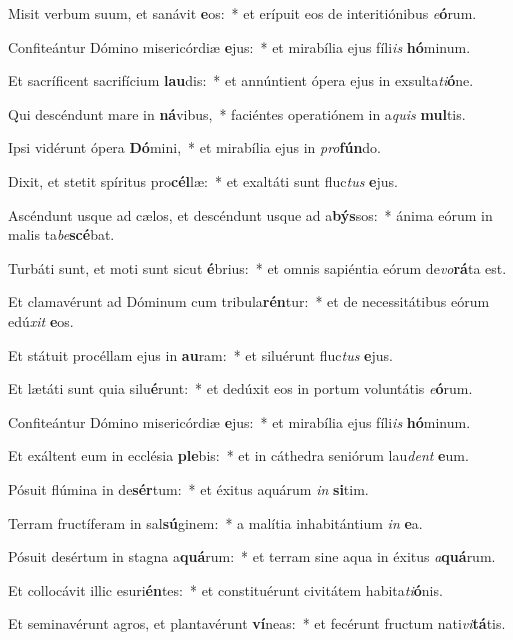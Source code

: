 \item Misit verbum suum, et sanávit \textbf{e}os:~* et erípuit eos de interitiónibus \textit{e}\textbf{ó}rum.
\item Confiteántur Dómino misericórdiæ \textbf{e}jus:~* et mirabília ejus fíli\textit{is} \textbf{hó}minum.
\item Et sacríficent sacrifícium \textbf{lau}dis:~* et annúntient ópera ejus in exsulta\textit{ti}\textbf{ó}ne.
\item Qui descéndunt mare in \textbf{ná}vibus,~* faciéntes operatiónem in a\textit{quis} \textbf{mul}tis.
\item Ipsi vidérunt ópera \textbf{Dó}mini,~* et mirabília ejus in \textit{pro}\textbf{fún}do.
\item Dixit, et stetit spíritus pro\textbf{cél}læ:~* et exaltáti sunt fluc\textit{tus} \textbf{e}jus.
\item Ascéndunt usque ad cælos, et descéndunt usque ad a\textbf{býs}sos:~* ánima eórum in malis ta\textit{be}\textbf{scé}bat.
\item Turbáti sunt, et moti sunt sicut \textbf{é}brius:~* et omnis sapiéntia eórum de\textit{vo}\textbf{rá}ta est.
\item Et clamavérunt ad Dóminum cum tribula\textbf{rén}tur:~* et de necessitátibus eórum edú\textit{xit} \textbf{e}os.
\item Et státuit procéllam ejus in \textbf{au}ram:~* et siluérunt fluc\textit{tus} \textbf{e}jus.
\item Et lætáti sunt quia silu\textbf{é}runt:~* et dedúxit eos in portum voluntátis \textit{e}\textbf{ó}rum.
\item Confiteántur Dómino misericórdiæ \textbf{e}jus:~* et mirabília ejus fíli\textit{is} \textbf{hó}minum.
\item Et exáltent eum in ecclésia \textbf{ple}bis:~* et in cáthedra seniórum lau\textit{dent} \textbf{e}um.
\item Pósuit flúmina in de\textbf{sér}tum:~* et éxitus aquárum \textit{in} \textbf{si}tim.
\item Terram fructíferam in sal\textbf{sú}ginem:~* a malítia inhabitántium \textit{in} \textbf{e}a.
\item Pósuit desértum in stagna a\textbf{quá}rum:~* et terram sine aqua in éxitus \textit{a}\textbf{quá}rum.
\item Et collocávit illic esuri\textbf{én}tes:~* et constituérunt civitátem habita\textit{ti}\textbf{ó}nis.
\item Et seminavérunt agros, et plantavérunt \textbf{ví}neas:~* et fecérunt fructum nati\textit{vi}\textbf{tá}tis.
